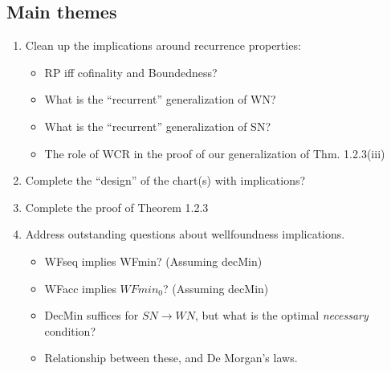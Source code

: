 \documentclass{scrartcl}
\begin{document}
\subsection{Main themes}
\begin{enumerate}
  \item Clean up the implications around recurrence properties:
  \begin{itemize}
    \item RP iff cofinality and Boundedness?
    \item What is the ``recurrent'' generalization of WN?
    \item What is the ``recurrent'' generalization of SN?
    \item The role of WCR in the proof of our generalization of Thm. 1.2.3(iii)
  \end{itemize}
  \item Complete the ``design'' of the chart(s) with implications?
  \item Complete the proof of Theorem 1.2.3
  \item Address outstanding questions about wellfoundness implications.
  \begin{itemize}
    \item WFseq implies WFmin? (Assuming decMin)
    \item WFacc implies $WFmin_0$? (Assuming decMin)
    \item DecMin suffices for $SN\to WN$, but what is the optimal \emph{necessary} condition?
    \item Relationship between these, and De Morgan's laws.
  \end{itemize}
\end{enumerate}
\end{document}
